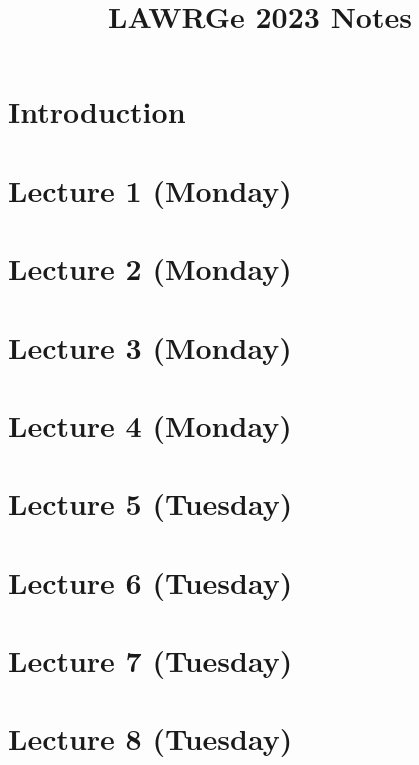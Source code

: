 \documentclass[12pt]{amsart}
\begin{document}
\title{LAWRGe 2023 Notes}


\maketitle

\setcounter{tocdepth}{1}

\tableofcontents

\section{Introduction}

\thispagestyle{empty}


\section{Lecture 1 (Monday)}


\section{Lecture 2 (Monday)}


\section{Lecture 3 (Monday)}


\section{Lecture 4 (Monday)}


\section{Lecture 5 (Tuesday)}


\section{Lecture 6 (Tuesday)}


\section{Lecture 7 (Tuesday)}


\section{Lecture 8 (Tuesday)}

\end{document}
